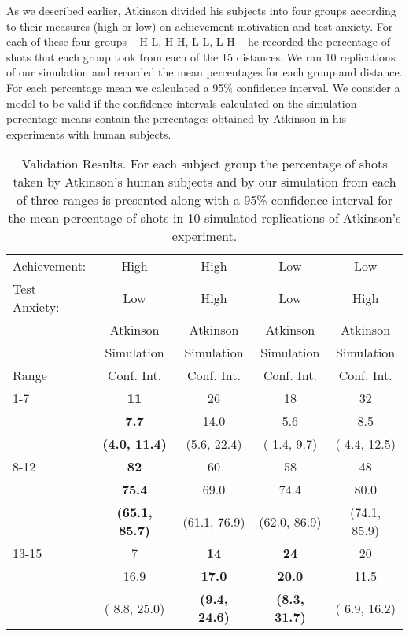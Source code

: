 As we described earlier, Atkinson divided his subjects into four groups according to their measures (high or low) on achievement motivation and test anxiety.  For each of these four groups -- H-L, H-H, L-L, L-H -- he recorded the percentage of shots that each group took from each of the 15 distances.  We ran 10 replications of our simulation and recorded the mean percentages for each group and distance.  For each percentage mean we calculated a 95\% confidence interval.  We consider a model to be valid if the confidence intervals calculated on the simulation percentage means contain the percentages obtained by Atkinson in his experiments with human subjects.

\begin{table*}[ht]
\begin{center}

\begin{tabular}{|l||c|c|c|c|} \hline
Achievement: & High & High & Low & Low \\
Test Anxiety: & Low & High & Low & High \\  \hline
 & Atkinson & Atkinson & Atkinson & Atkinson \\
 & Simulation & Simulation & Simulation & Simulation \\
Range & Conf. Int. & Conf. Int. & Conf. Int. & Conf. Int. \\ \hline\hline
  1-7 & \bf{11}           & 26              & 18           & 32 \\
      & \bf{7.7}          & 14.0            &  5.6         &  8.5 \\
      & \bf{(4.0, 11.4)}  & (5.6, 22.4)     & ( 1.4,  9.7) & ( 4.4, 12.5)\\ \hline
8-12  & \bf{82}           & 60               & 58           & 48 \\
      & \bf{75.4}         & 69.0             & 74.4         & 80.0 \\
      & \bf{(65.1, 85.7)} & (61.1, 76.9)     & (62.0, 86.9) & (74.1, 85.9)\\ \hline
13-15 & 7                 & \bf{14}           & \bf{24}           & 20 \\
      & 16.9              & \bf{17.0}         & \bf{20.0}         & 11.5 \\
      & ( 8.8, 25.0)      & \bf{(9.4, 24.6)}  & \bf{(8.3, 31.7)} & ( 6.9, 16.2)\\ \hline
\end{tabular}
\caption{Validation Results.  For each subject group the percentage of shots taken by Atkinson's human subjects and by our simulation from each of three ranges is presented along with a 95\% confidence interval for the mean percentage of shots in 10 simulated replications of Atkinson's experiment.}
\label{tab:results}


\end{center}
\end{table*}

